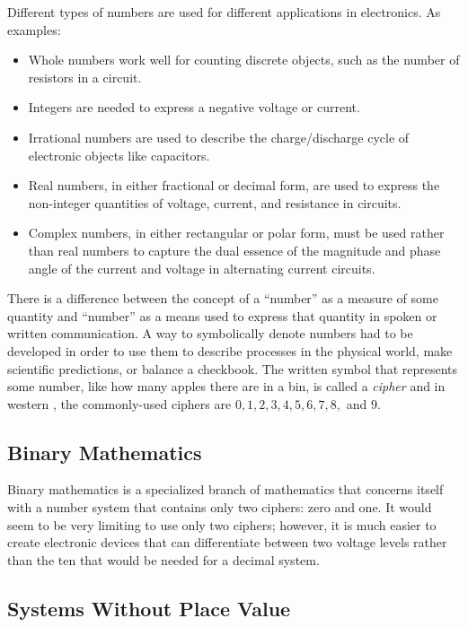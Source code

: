 Different types of numbers are used for different applications in electronics. As examples:

\begin{itemize}
  \item Whole numbers work well for counting discrete objects, such as the number of resistors in a circuit. 
  \item Integers are needed to express a negative voltage or current. 
  \item Irrational numbers are used to describe the charge/discharge cycle of electronic objects like capacitors.
  \item Real numbers, in either fractional or decimal form, are used to express the non-integer quantities of voltage, current, and resistance in circuits.
  \item Complex numbers, in either rectangular or polar form, must be used rather than real numbers to capture the dual essence of the magnitude and phase angle of the current and voltage in alternating current circuits.
\end{itemize}

There is a difference between the concept of a ``number'' as a measure of some quantity and ``number'' as a means used to express that quantity in spoken or written communication. A way to symbolically denote numbers had to be developed in order to use them to describe processes in the physical world, make scientific predictions, or balance a checkbook. The written symbol that represents some number, like how many apples there are in a bin, is called a \emph{cipher} and in western , the commonly-used ciphers are $ 0, 1, 2, 3, 4, 5, 6, 7, 8, $ and $ 9 $.

\subsection{Binary Mathematics}
\label{MF:sub:binary_mathematics}
Binary mathematics is a specialized branch of mathematics that concerns itself with a number system that contains only two ciphers: zero and one. It would seem to be very limiting to use only two ciphers; however, it is much easier to create electronic devices that can differentiate between two voltage levels rather than the ten that would be needed for a decimal system.

\subsection{Systems Without Place Value}
\label{MF:sub:sysems_without_place_value}
